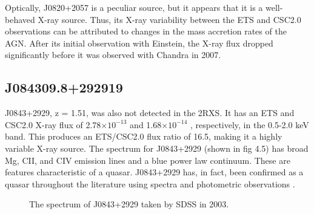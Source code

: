 \FloatBarrier

Optically, J0820+2057 is a peculiar source, but it appears that it is a well-behaved X-ray source. 
Thus, its X-ray variability between the ETS and CSC2.0 observations can be attributed to changes in the mass accretion rates of the AGN. 
After its initial observation with Einstein, the X-ray flux dropped significantly before it was observed with Chandra in 2007.



\subsection{J084309.8+292919}

J0843+2929, z = 1.51, was also not detected in the 2RXS. It has an ETS and CSC2.0 X-ray flux of 2.78$\times 10^{-13}$ \fluxunits and 1.68$\times 10^{-14}$ \fluxunits, respectively, in the 0.5-2.0 keV band. 
This produces an ETS/CSC2.0 flux ratio of 16.5, making it a highly variable X-ray source.
The spectrum for J0843+2929 (shown in fig 4.5) has broad Mg, CII, and CIV emission lines and a blue power law continuum. 
These are features characteristic of a quasar.
J0843+2929 has, in fact, been confirmed as a quasar throughout the literature using spectra and photometric observations \citep{schneider2007,richards2015}.


\begin{figure}[h]
\centering
{}
\caption{The spectrum of J0843+2929 taken by SDSS in 2003.}
\label{imbeded_fb}
\end{figure}



